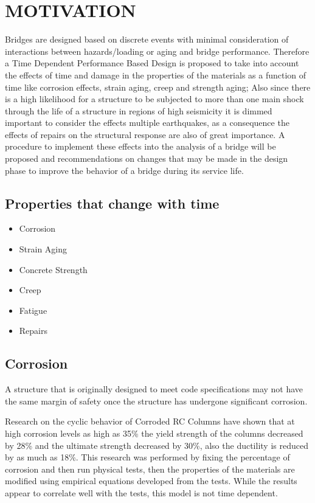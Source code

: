 \chapter{MOTIVATION}
\label{chap-one}

Bridges are designed based on discrete events with minimal consideration of interactions between hazards/loading or aging and bridge performance. Therefore a Time Dependent Performance Based Design is proposed to take into account the effects of time and damage in the properties of the materials as a function of time like corrosion effects, strain aging, creep and strength aging; Also since there is a high likelihood for a structure to be subjected to more than one main shock through the life of a structure in regions of high seismicity it is dimmed important to consider the effects multiple earthquakes, as a consequence the effects of repairs on the structural response are also of great importance. A procedure to implement these effects into the analysis of a bridge will be proposed and recommendations on changes that may be made in the design phase to improve the behavior of a bridge during its service life.

\section{Properties that change with time}

\begin{itemize}
   \item Corrosion
   \item Strain Aging
   \item Concrete Strength
   \item Creep
   \item Fatigue
   \item Repairs
\end{itemize}

\section{Corrosion}

A structure that is originally designed to meet code specifications may not have the same margin of safety once the structure has undergone significant corrosion. 

Research on the cyclic behavior of Corroded RC Columns \cite{Yuan2017a} have shown that at high corrosion levels as high as 35\% the yield strength of the columns decreased by 28\% and the ultimate strength decreased by 30\%, also the ductility is reduced by as much as 18\%. This research was performed by fixing the percentage of corrosion and then run physical tests, then the properties of the materials are modified using empirical equations developed from the tests. While the results appear to correlate well with the tests, this model is not time dependent.

